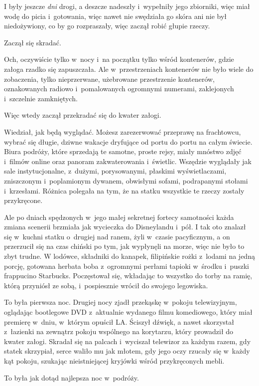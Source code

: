 \documentclass[oneside,polish,11pt,rmheadings]{mwbk}
\begin{document}
I były jeszcze \textit{dni }drogi, a deszcze nadeszły i~wypełniły jego zbiorniki, więc miał wodę do picia i~gotowania, więc nawet nie swędziała go skóra ani nie był niedożywiony, co by go rozpraszały, więc zaczął robić głupie rzeczy.

Zaczął się skradać.

Och, oczywiście tylko w~nocy i~na początku tylko wśród kontenerów, gdzie załoga rzadko się zapuszczała. Ale w~przestrzeniach kontenerów nie było wiele do zobaczenia, tylko nieprzerwane, użebrowane przestrzenie kontenerów, oznakowanych radiowo i~pomalowanych ogromnymi numerami, zaklejonych i~szczelnie zamkniętych.

Więc wtedy zaczął przekradać się do kwater załogi.

Wiedział, jak będą wyglądać. Możesz zarezerwować przeprawę na frachtowcu, wybrać się długie, dziwne wakacje dryfujące od portu do portu na całym świecie. Biura podróży, które sprzedają te samotne, proste rejsy, miały mnóstwo zdjęć i~filmów online oraz panoram zakwaterowania i~świetlic. Wszędzie wyglądały jak sale instytucjonalne, z~dużymi, porysowanymi, płaskimi wyświetlaczami, zniszczonym i~poplamionym dywanem, obwisłymi sofami, podrapanymi stołami i~krzesłami. Różnica polegała na tym, że na statku wszystkie te rzeczy zostały przykręcone.

Ale po dniach spędzonych w~jego małej sekretnej fortecy samotności każda zmiana scenerii brzmiała jak wycieczka do Disneylandu i~pół. I tak oto znalazł się w~kuchni statku o~drugiej nad ranem, żyli w~czasie pacyficznym, a on przerzucił się na czas chiński po tym, jak wypłynęli na morze, więc nie było to zbyt trudne. W lodówce, składniki do kanapek, filipińskie rożki z~lodami na jedną porcję, gotowana herbata boba z~ogromnymi perłami tapioki w~środku i~puszki frappucino Starbucks. Poczęstował się, wkładając to wszystko do torby na ramię, którą przyniósł ze sobą, i~pospiesznie wrócił do swojego legowiska.

To była pierwsza noc. Drugiej nocy zjadł przekąskę w~pokoju telewizyjnym, oglądając bootlegowe DVD z~aktualnie wydanego filmu komediowego, który miał premierę w~dniu, w~którym opuścił LA. Ściszył dźwięk, a nawet skorzystał z~łazienki na zewnątrz pokoju wspólnego na korytarzu, który prowadził do kwater załogi. Skradał się na palcach i~wyciszał telewizor za każdym razem, gdy statek skrzypiał, serce waliło mu jak młotem, gdy jego oczy rzucały się w~każdy kąt pokoju, szukając nieistniejącej kryjówki wśród przykręconych mebli.

To była jak dotąd najlepsza noc w~podróży.
\end{document}
